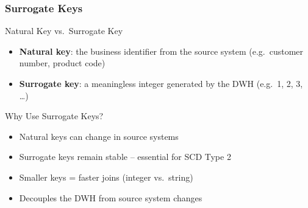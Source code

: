 \begin{frame}
  \frametitle{Surrogate Keys}

  \begin{block}{Natural Key vs.\ Surrogate Key}
    \begin{itemize}
      \item \textbf{Natural key}: the business identifier from the source system
        (e.g.\ customer number, product code)
      \item \textbf{Surrogate key}: a meaningless integer generated by the DWH
        (e.g.\ 1, 2, 3, \ldots)
    \end{itemize}
  \end{block}

  \begin{block}{Why Use Surrogate Keys?}
    \begin{itemize}
      \item Natural keys can change in source systems
      \item Surrogate keys remain stable -- essential for SCD Type 2
      \item Smaller keys = faster joins (integer vs.\ string)
      \item Decouples the DWH from source system changes
    \end{itemize}
  \end{block}

\end{frame}

